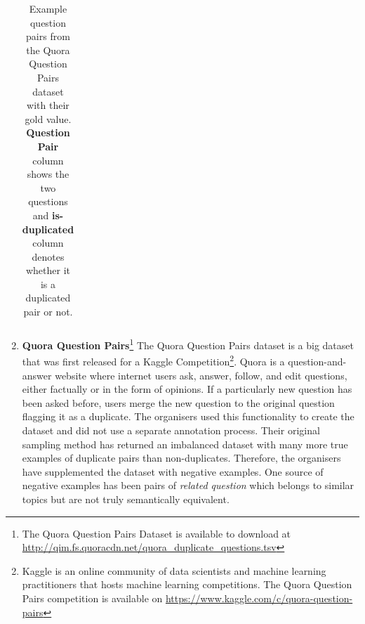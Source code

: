 \begin{enumerate}
\begin{table}[ht!]
\begin{tabular}{l|c}
	\end{tabular}
	\caption[Example question pairs from the Quora Question Pairs dataset]{Example question  pairs from the Quora Question Pairs dataset with their gold  value. \textbf{Question Pair} column shows the two questions and \textbf{is-duplicated} column denotes whether it is a duplicated pair or not.}
	\label{tab:quoradata}
\end{table}  


 \item \textbf{Quora Question Pairs}\footnote{The Quora Question Pairs Dataset is available to download at \url{http://qim.fs.quoracdn.net/quora_duplicate_questions.tsv}} The Quora Question Pairs dataset is a big dataset that was first released for a Kaggle Competition\footnote{Kaggle is an online community of data scientists and machine learning practitioners that hosts machine learning competitions. The Quora Question Pairs competition is available on \url{https://www.kaggle.com/c/quora-question-pairs}}. Quora is a question-and-answer website where internet users ask, answer, follow, and edit questions, either factually or in the form of opinions. If a particularly new question has been asked before, users merge the new question to the original question flagging it as a duplicate. The organisers used this functionality to create the dataset and did not use a separate annotation process. Their original sampling method has returned an imbalanced dataset with many more true examples of duplicate pairs than non-duplicates. Therefore, the organisers have supplemented the dataset with negative examples. One source of negative examples has been pairs of \textit{related question} which belongs to similar topics but are not truly semantically equivalent.  
 


\end{enumerate}
